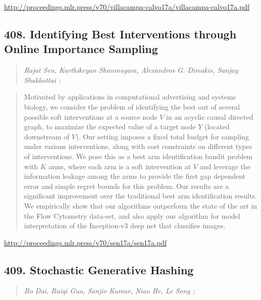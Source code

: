 \documentclass{article}
\begin{document}
\href{http://proceedings.mlr.press/v70/villacampa-calvo17a/villacampa-calvo17a.pdf}{http://proceedings.mlr.press/v70/villacampa-calvo17a/villacampa-calvo17a.pdf}

\subsection{408. Identifying Best Interventions through Online Importance Sampling}

\begin{quote}
\footnotesize{\textit{Rajat Sen, Karthikeyan Shanmugam, Alexandros G. Dimakis, Sanjay Shakkottai ;}}
\end{quote}

\begin{quote}
    Motivated by applications in computational advertising and systems biology, we consider the problem of identifying the best out of several possible soft interventions at a source node $V$ in an acyclic causal directed graph, to maximize the expected value of a target node $Y$ (located downstream of $V$). Our setting imposes a fixed total budget for sampling under various interventions, along with cost constraints on different types of interventions. We pose this as a best arm identification bandit problem with $K$ arms, where each arm is a soft intervention at $V$ and leverage the information leakage among the arms to provide the first gap dependent error and simple regret bounds for this problem. Our results are a significant improvement over the traditional best arm identification results. We empirically show that our algorithms outperform the state of the art in the Flow Cytometry data-set, and also apply our algorithm for model interpretation of the Inception-v3 deep net that classifies images.  \end{quote}

\href{http://proceedings.mlr.press/v70/sen17a/sen17a.pdf}{http://proceedings.mlr.press/v70/sen17a/sen17a.pdf}

\subsection{409. Stochastic Generative Hashing}

\begin{quote}
\footnotesize{\textit{Bo Dai, Ruiqi Guo, Sanjiv Kumar, Niao He, Le Song ;}}
\end{quote}
\end{document}
